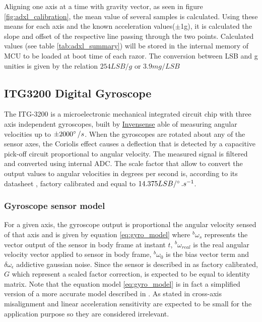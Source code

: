 Aligning one axis at a time with gravity vector, as seen in figure
\ref{fig:adxl_calibration}, the mean value of several samples is calculated.
Using these means for each axis and the known acceleration
values(\ensuremath{\pm}1g), it is calculated the slope and offset of the
respective line passing through the two points. Calculated values (see table \ref{tab:adxl_summary}) will be stored
in the internal  memory of \gls{MCU} to be loaded at
boot time of each razor. The conversion between LSB and g unities is given by
the relation $254LSB/g$ or $3.9mg/LSB$ \cite{adxl345_datasheet}

\subsection{ITG3200 Digital Gyroscope} \label{subsection:itg3200}

The ITG-3200 is a microelectronic mechanical integrated circuit chip with three
axis independent gyroscopes, built by
\href{http://www.invensense.com/}{Invensense} able of measuring angular
velocities up to $\pm2000^\circ\,/s$. When the gyroscopes are rotated about any
of the sensor axes, the Coriolis effect causes a deflection that is  detected by
a capacitive pick-off circuit proportional to angular velocity. The measured signal is filtered and converted using internal \gls{ADC}. The scale factor that allow to convert the
output values to angular velocities in degrees per second is, according to its
datasheet \cite{itg3200_datasheet}, factory calibrated and equal to
$14.375LSB/^\circ\,.s^{-1}$.

\subsubsection{Gyroscope sensor model} \label{subsubsection:itg3200model}


For a given axis, the gyroscope output is proportional the angular velocity
sensed of that axis and is given by equation \eqref{eq:gyro_model} where
${}^b\omega_{s}$ represents the vector output of the sensor in body
frame at instant $t$, ${}^b\omega_{real}$ is the real angular velocity
vector applied to sensor in body frame, ${}^b\omega_{0}$ is the bias
vector term and $\delta\omega_{\epsilon}$ addictive gaussian noise.
Since the sensor is described in \cite{itg3200_datasheet} as factory calibrated,
$G$ which represent a scaled factor correction, is expected to be equal to
identity matrix. Note that the equation model \eqref{eq:gyro_model} is in fact a
simplified version of a more accurate model described in
\cite{Vectornav_calibration}. As stated in \cite{Vectornav_calibration}
cross-axis misalignment and linear acceleration sensitivity are expected to be
small for the application purpose so they are considered irrelevant.

